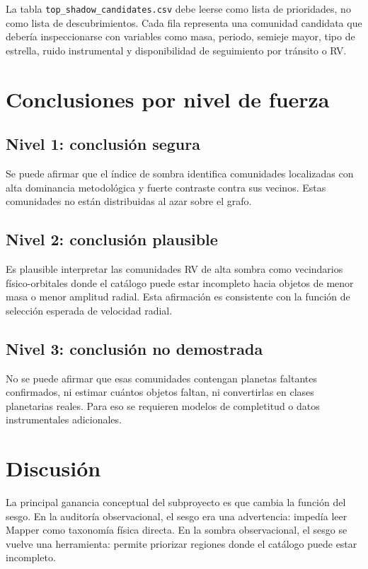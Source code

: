 \documentclass[11pt]{article}
\begin{document}
La tabla \texttt{top\_shadow\_candidates.csv} debe leerse como lista de prioridades, no como lista de descubrimientos. Cada fila representa una comunidad candidata que debería inspeccionarse con variables como masa, periodo, semieje mayor, tipo de estrella, ruido instrumental y disponibilidad de seguimiento por tránsito o RV.

\section{Conclusiones por nivel de fuerza}

\subsection*{Nivel 1: conclusión segura}

Se puede afirmar que el índice de sombra identifica comunidades localizadas con alta dominancia metodológica y fuerte contraste contra sus vecinos. Estas comunidades no están distribuidas al azar sobre el grafo.

\subsection*{Nivel 2: conclusión plausible}

Es plausible interpretar las comunidades RV de alta sombra como vecindarios físico-orbitales donde el catálogo puede estar incompleto hacia objetos de menor masa o menor amplitud radial. Esta afirmación es consistente con la función de selección esperada de velocidad radial.

\subsection*{Nivel 3: conclusión no demostrada}

No se puede afirmar que esas comunidades contengan planetas faltantes confirmados, ni estimar cuántos objetos faltan, ni convertirlas en clases planetarias reales. Para eso se requieren modelos de completitud o datos instrumentales adicionales.

\section{Discusión}

La principal ganancia conceptual del subproyecto es que cambia la función del sesgo. En la auditoría observacional, el sesgo era una advertencia: impedía leer Mapper como taxonomía física directa. En la sombra observacional, el sesgo se vuelve una herramienta: permite priorizar regiones donde el catálogo puede estar incompleto.
\end{document}
